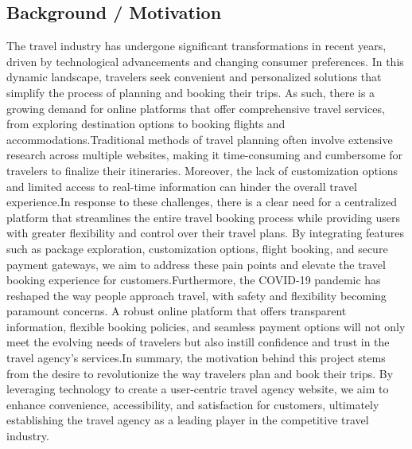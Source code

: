 \documentclass[12pt]{article}
\begin{document}
\subsection * {Background / Motivation}
The travel industry has undergone significant transformations in recent years, driven by technological advancements and changing consumer preferences. In this dynamic landscape, travelers seek convenient and personalized solutions that simplify the process of planning and booking their trips. As such, there is a growing demand for online platforms that offer comprehensive travel services, from exploring destination options to booking flights and accommodations.\newline Traditional methods of travel planning often involve extensive research across multiple websites, making it time-consuming and cumbersome for travelers to finalize their itineraries. Moreover, the lack of customization options and limited access to real-time information can hinder the overall travel experience.\newline In response to these challenges, there is a clear need for a centralized platform that streamlines the entire travel booking process while providing users with greater flexibility and control over their travel plans. By integrating features such as package exploration, customization options, flight booking, and secure payment gateways, we aim to address these pain points and elevate the travel booking experience for customers.\newline Furthermore, the COVID-19 pandemic has reshaped the way people approach travel, with safety and flexibility becoming paramount concerns. A robust online platform that offers transparent information, flexible booking policies, and seamless payment options will not only meet the evolving needs of travelers but also instill confidence and trust in the travel agency's services.\newline In summary, the motivation behind this project stems from the desire to revolutionize the way travelers plan and book their trips. By leveraging technology to create a user-centric travel agency website, we aim to enhance convenience, accessibility, and satisfaction for customers, ultimately establishing the travel agency as a leading player in the competitive travel industry.
\end{document}

